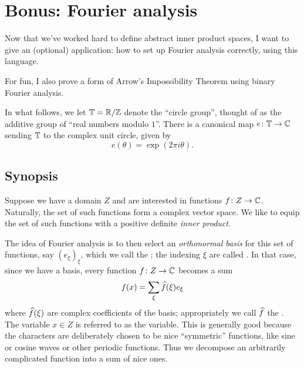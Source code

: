 \chapter{Bonus: Fourier analysis}
\label{ch:fourier}
Now that we've worked hard to define abstract inner product spaces,
I want to give an (optional) application:
how to set up Fourier analysis correctly, using this language.

For fun, I also prove a form of Arrow's Impossibility Theorem
using binary Fourier analysis.

In what follows, we let $\mathbb T = \mathbb R/\mathbb Z$ denote the ``circle group'',
thought of as the additive group of ``real numbers modulo $1$''.
There is a canonical map $e \colon \mathbb T \to \mathbb C$ sending $\mathbb T$ to the
complex unit circle, given by
\[ e(\theta) = \exp(2\pi i \theta). \]

\section{Synopsis}
Suppose we have a domain $Z$ and are interested in functions $f \colon Z \to \mathbb C$.
Naturally, the set of such functions form a complex vector space.
We like to equip the set of such functions
with a positive definite \emph{inner product}.

The idea of Fourier analysis is to then select an \emph{orthonormal basis}
for this set of functions, say $(e_\xi)_{\xi}$,
which we call the ;
the indexing $\xi$ are called .
In that case, since we have a basis, every function $f \colon Z \to \mathbb C$
becomes a sum
\[ f(x) = \sum_{\xi} \widehat f(\xi) e_\xi \]
where $\widehat f(\xi)$ are complex coefficients of the basis;
appropriately we call $\widehat f$ the .
The variable $x \in Z$ is referred to as the  variable.
This is generally good because the characters are deliberately chosen
to be nice ``symmetric'' functions,
like sine or cosine waves or other periodic functions.
Thus we decompose an arbitrarily complicated function into a sum of nice ones.

